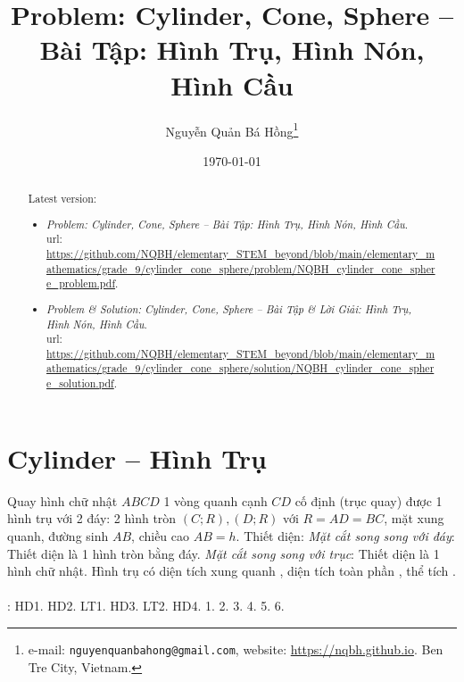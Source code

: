 \documentclass{article}
\title{Problem: Cylinder, Cone, Sphere -- Bài Tập: Hình Trụ, Hình Nón, Hình Cầu}
\author{Nguyễn Quản Bá Hồng\footnote{e-mail: \texttt{nguyenquanbahong@gmail.com}, website: \url{https://nqbh.github.io}. Ben Tre City, Vietnam.}}
\date{\today}
\begin{document}
\maketitle
\begin{abstract}
	Latest version:
	\begin{itemize}
		\item \textit{Problem: Cylinder, Cone, Sphere -- Bài Tập: Hình Trụ, Hình Nón, Hình Cầu}.\\{\sc url}: \url{https://github.com/NQBH/elementary_STEM_beyond/blob/main/elementary_mathematics/grade_9/cylinder_cone_sphere/problem/NQBH_cylinder_cone_sphere_problem.pdf}.
		\item \textit{Problem \& Solution: Cylinder, Cone, Sphere -- Bài Tập \& Lời Giải: Hình Trụ, Hình Nón, Hình Cầu}.\\{\sc url}: \url{https://github.com/NQBH/elementary_STEM_beyond/blob/main/elementary_mathematics/grade_9/cylinder_cone_sphere/solution/NQBH_cylinder_cone_sphere_solution.pdf}.
	\end{itemize}
\end{abstract}
\tableofcontents


\section{Cylinder -- Hình Trụ}

\begin{center}
\end{center}
 Quay hình chữ nhật $ABCD$ 1 vòng quanh cạnh $CD$ cố định (trục quay) được 1 hình trụ với 2 đáy: 2 hình tròn $(C;R),(D;R)$ với $R = AD = BC$, mặt xung quanh, đường sinh $AB$, chiều cao $AB = h$.  {\sf Thiết diện}: \textit{Mặt cắt song song với đáy}: Thiết diện là 1 hình tròn bằng đáy. \textit{Mặt cắt song song với trục}: Thiết diện là 1 hình chữ nhật.  Hình trụ có diện tích xung quanh , diện tích toàn phần , thể tích .\\
\\
\cite[Chap. X, \S1, pp. 92--97]{SGK_Toan_9_Canh_Dieu_tap_1}: HD1. HD2. LT1. HD3. LT2. HD4. 1. 2. 3. 4. 5. 6.
\end{document}
